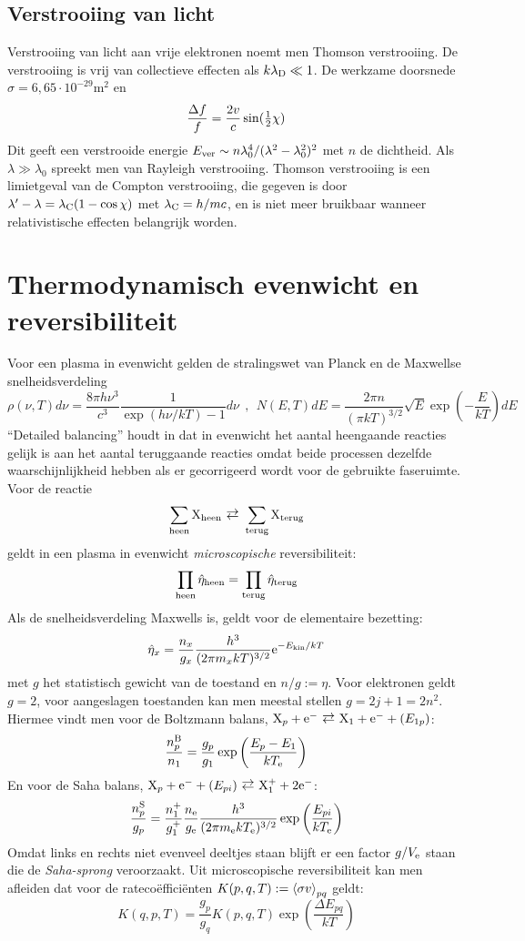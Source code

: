 \subsection{Verstrooiing van licht}
Verstrooiing van licht aan vrije elektronen noemt men Thomson verstrooiing.
De verstrooiing is vrij van collectieve effecten als $k\lambda_{\rm D}\ll1$.
De werkzame doorsnede $\sigma=6,65\cdot10^{-29}$m$^2$ en
\[
\frac{\Delta f}{f}=\frac{2v}{c}\sin(\mbox{$\frac{1}{2}$}\chi)
\]
Dit geeft een verstrooide energie
$E_{\rm ver}\sim n\lambda_0^4/(\lambda^2-\lambda_0^2)^2$ met $n$ de dichtheid.
Als $\lambda\gg\lambda_0$ spreekt men van Rayleigh verstrooiing. Thomson
verstrooiing is een limietgeval van de Compton verstrooiing, die gegeven is
door $\lambda'-\lambda=\lambda_{\rm C}(1-\cos\chi)$ met $\lambda_{\rm C}=h/mc$,
en is niet meer bruikbaar wanneer relativistische effecten belangrijk worden.

\section{Thermodynamisch evenwicht en reversibiliteit}
Voor een plasma in evenwicht gelden de stralingswet van Planck en de
Maxwellse snelheidsverdeling
\[
\rho(\nu,T)d\nu=\frac{8\pi h\nu^3}{c^3}\frac{1}{\exp(h\nu/kT)-1}d\nu~~,~~
N(E,T)dE=\frac{2\pi n}{(\pi kT)^{3/2}}\sqrt{E}\exp\left(-\frac{E}{kT}\right)dE
\]
``Detailed balancing'' houdt in dat in evenwicht het aantal heengaande
reacties gelijk is aan het aantal teruggaande reacties omdat beide processen
dezelfde waarschijnlijkheid hebben als er gecorrigeerd wordt voor de gebruikte
faseruimte. Voor de reactie
\[
\sum_{\rm heen}{\rm X}_{\rm heen}\rlarrow\sum_{\rm terug}{\rm X}_{\rm terug}
\]
geldt in een plasma in evenwicht {\it microscopische} reversibiliteit:
\[
\prod_{\rm heen}\hat{\eta}_{\rm heen}=\prod_{\rm terug}\hat{\eta}_{\rm terug}
\]
Als de snelheidsverdeling Maxwells is, geldt voor de elementaire bezetting:
\[
\hat{\eta}_{x}=\frac{n_x}{g_x}\frac{h^3}{(2\pi m_xkT)^{3/2}}{\rm e}^{-E_{\rm kin}/kT}
\]
met $g$ het statistisch gewicht van de toestand en $n/g:=\eta$. Voor
elektronen geldt $g=2$, voor aangeslagen toestanden kan men meestal stellen
$g=2j+1=2n^2$.
\npar
Hiermee vindt men voor de Boltzmann balans,
${\rm X}_p+{\rm e}^-\rlarrow{\rm X}_1+{\rm e}^-+(E_{1p})$:
\[
\frac{n_p^{\rm B}}{n_1}=\frac{g_p}{g_1}\exp\left(\frac{E_p-E_1}{kT_{\rm e}}\right)
\]
En voor de Saha balans,
${\rm X}_p+{\rm e}^-+(E_{pi})\rlarrow{\rm X}_1^++2{\rm e}^-$:
\[
\frac{n_p^{\rm S}}{g_p}=\frac{n_1^+}{g_1^+}\frac{n_{\rm e}}{g_{\rm e}}
\frac{h^3}{(2\pi m_{\rm e} kT_{\rm e})^{3/2}}\exp\left(\frac{E_{pi}}{kT_{\rm e}}\right)
\]
Omdat links en rechts niet evenveel deeltjes staan blijft er een factor
$g/V_{\rm e}$ staan die de {\it Saha-sprong} veroorzaakt.
\npar
Uit microscopische reversibiliteit kan men afleiden dat voor de
rateco\"effici\"enten $K(p,q,T):=\left\langle \sigma v \right\rangle_{pq}$ geldt:
\[
K(q,p,T)=\frac{g_p}{g_q}K(p,q,T)\exp\left(\frac{\Delta E_{pq}}{kT}\right)
\]

